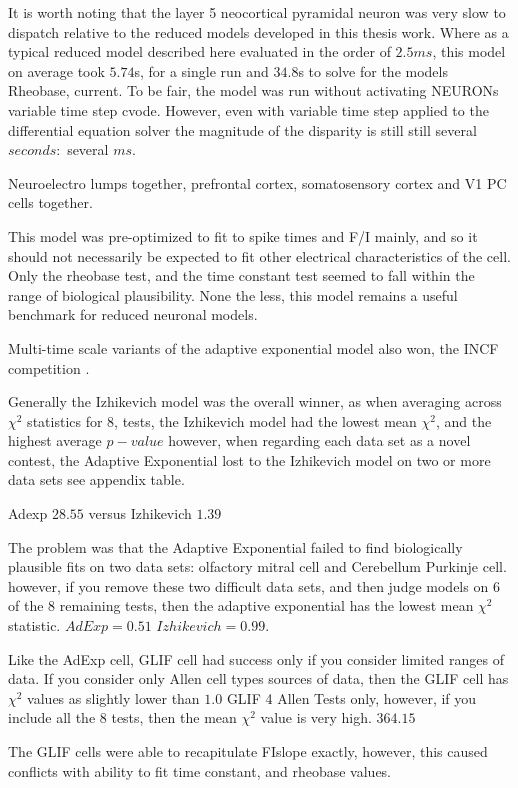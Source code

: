 It is worth noting that the layer 5 neocortical pyramidal neuron was very slow to dispatch relative to the reduced models developed in this thesis work. Where as a typical reduced model described here evaluated in the order of $2.5 ms$, this model on average took $5.74$s, for a single run and $34.8$s to solve for the models Rheobase, current. To be fair, the model was run without activating NEURONs variable time step cvode. However, even with variable time step applied to the differential equation solver the magnitude of the disparity is still still several $seconds:$ several $ ms$.

Neuroelectro lumps together, prefrontal cortex, somatosensory cortex and V1 PC cells together.

This model was pre-optimized to fit to spike times and F/I mainly, and so it should not necessarily be expected to fit other electrical characteristics of the cell. Only the rheobase test, and the time constant test seemed to fall within the range of biological plausibility.
None the less, this model remains a useful benchmark for reduced neuronal models.

Multi-time scale variants of the adaptive exponential model also won, the INCF competition \cite{incf_multi}.


Generally the Izhikevich model was the overall winner, as when averaging across $\chi^{2}$ statistics for 8, tests, the Izhikevich model had the lowest mean $\chi^{2}$, and the highest average $p-value$ however, when regarding each data set as a novel contest, the Adaptive Exponential lost to the Izhikevich model on two or more data sets see appendix table.

Adexp $28.55$ versus 
Izhikevich $1.39$

The problem was that the Adaptive Exponential failed to find biologically plausible fits on two data sets: olfactory mitral cell and Cerebellum Purkinje cell. however, if you remove these two difficult data sets, and then judge models on 6 of the 8 remaining tests, then the adaptive exponential has the lowest mean $\chi^{2}$ statistic. $AdExp=0.51$	$Izhikevich=0.99$.

Like the AdExp cell, GLIF cell had success only if you consider limited ranges of data. If you consider only Allen cell types sources of data, then the GLIF cell has $\chi^{2}$ values as slightly lower than $1.0$ GLIF 4 Allen Tests only, however, if you include all the 8 tests, then the mean $\chi^{2}$ value is very high. $364.15$

The GLIF cells were able to recapitulate FIslope exactly, however, this caused conflicts with ability to fit time constant, and rheobase values.

